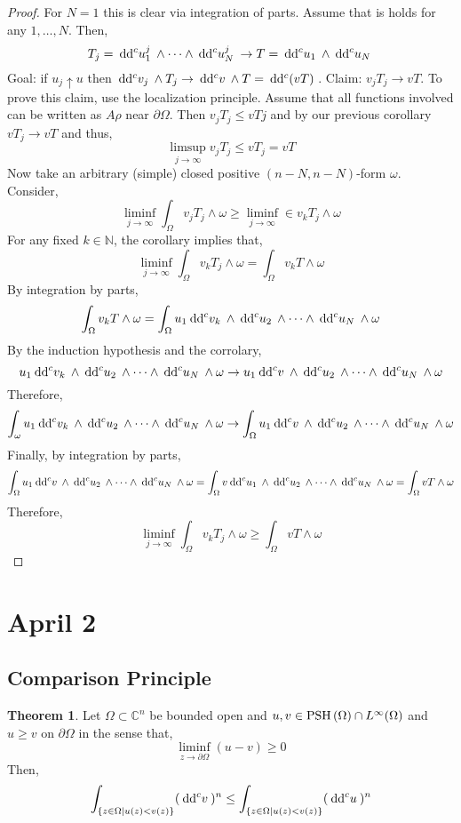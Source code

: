 \documentclass[12pt]{extarticle}
\newcommand{\N}{\mathbb{N}}
\newcommand{\C}{\mathbb{C}}
\theoremstyle{definition}
\newtheorem{theorem}{Theorem}[section]
\begin{document}
\begin{proof}
For $N = 1$ this is clear via integration of parts. Assume that is holds for any $1, \dots, N$. Then,
\[ T_j = \: \mathrm{d}\mathrm{d}^c{u_1^j} \: \wedge \cdots \wedge \: \mathrm{d}\mathrm{d}^c{u_N^j} \: \to T = \: \mathrm{d}\mathrm{d}^c{u_1} \: \wedge \: \mathrm{d}\mathrm{d}^c{u_N} \: \]
Goal: if $u_j \uparrow u$ then $\: \mathrm{d}\mathrm{d}^c{v_j} \: \wedge T_j \to \: \mathrm{d}\mathrm{d}^c{v} \: \wedge T = \: \mathrm{d}\mathrm{d}^c{(v T)} \:$. Claim: $v_j T_j \to v T$. To prove this claim, use the localization principle. Assume that all functions involved can be written as $A \rho$ near $\partial \Omega$. Then $v_j T_j \le v Tj$ and by our previous corollary $v T_j \to v T$ and thus,
\[ \limsup_{j \to \infty} v_j T_j \le v T_j = v T \]
Now take an arbitrary (simple) closed positive $(n - N, n - N)$-form $\omega$. Consider,
\[ \liminf_{j \to \infty} \int_\Omega v_j T_j \wedge \omega \ge \liminf_{j \to \infty} \in v_k T_j \wedge \omega \]
For any fixed $k \in \N$, the corollary implies that,
\[ \liminf_{j \to \infty} \int_\Omega v_k T_j \wedge \omega = \int_\Omega v_k T \wedge \omega \] 
By integration by parts,
\[ \int_\Omega v_k T \wedge \omega = \int_\Omega u_1 \: \mathrm{d}\mathrm{d}^c{v_k} \: \wedge \: \mathrm{d}\mathrm{d}^c{u_2} \: \wedge \cdots \wedge \: \mathrm{d}\mathrm{d}^c{u_N} \: \wedge \omega \]
By the induction hypothesis and the corrolary,
\[ u_1 \: \mathrm{d}\mathrm{d}^c{v_k} \: \wedge \: \mathrm{d}\mathrm{d}^c{u_2} \: \wedge \cdots \wedge \: \mathrm{d}\mathrm{d}^c{u_N} \: \wedge \omega \to u_1 \: \mathrm{d}\mathrm{d}^c{v} \: \wedge \: \mathrm{d}\mathrm{d}^c{u_2} \: \wedge \cdots \wedge \: \mathrm{d}\mathrm{d}^c{u_N} \: \wedge \omega \] 
Therefore,
\[ \int_\omega u_1 \: \mathrm{d}\mathrm{d}^c{v_k} \: \wedge \: \mathrm{d}\mathrm{d}^c{u_2} \: \wedge \cdots \wedge \: \mathrm{d}\mathrm{d}^c{u_N} \: \wedge \omega \to \int_\Omega u_1 \: \mathrm{d}\mathrm{d}^c{v} \: \wedge \: \mathrm{d}\mathrm{d}^c{u_2} \: \wedge \cdots \wedge \: \mathrm{d}\mathrm{d}^c{u_N} \: \wedge \omega \]
Finally, by integration by parts,
\[  \int_\Omega u_1 \: \mathrm{d}\mathrm{d}^c{v} \: \wedge \: \mathrm{d}\mathrm{d}^c{u_2} \: \wedge \cdots \wedge \: \mathrm{d}\mathrm{d}^c{u_N} \: \wedge \omega = \int_\Omega v \: \mathrm{d}\mathrm{d}^c{u_1} \: \wedge \: \mathrm{d}\mathrm{d}^c{u_2} \: \wedge \cdots \wedge \: \mathrm{d}\mathrm{d}^c{u_N} \: \wedge \omega = \int_\Omega v T \wedge \omega \]
Therefore,
\[ \liminf_{j \to \infty} \int_\Omega v_k T_j \wedge \omega \ge \int_\Omega v T \wedge \omega \]
\end{proof}

\section{April 2}

\subsection{Comparison Principle}

\begin{theorem}
Let $\Omega \subset \C^n$ be bounded open and $u,v \in \mathrm{PSH}\left( \Omega \right) \cap L^\infty(\Omega)$ and $u \ge v$ on $\partial \Omega$ in the sense that,
\[ \liminf_{z \to \partial \Omega} (u - v) \ge 0 \]
Then,
\[ \int_{\{z \in \Omega \mid u(z) < v(z) \}} (\: \mathrm{d}\mathrm{d}^c{v} \:)^n \le \int_{\{z \in \Omega \mid u(z) < v(z) \}} (\: \mathrm{d}\mathrm{d}^c{u} \:)^n \] 
\end{theorem}
\end{document}
